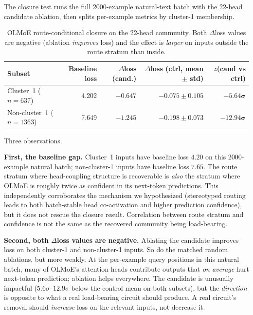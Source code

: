 \documentclass[11pt]{article}
\begin{document}
The closure test runs the full 2000-example natural-text batch with the
22-head candidate ablation, then splits per-example metrics by cluster-1
membership.

\begin{table}[h]
\centering
\small
\begin{tabularx}{\textwidth}{lrrrr}
\toprule
Subset & Baseline loss & $\Delta$loss (cand.) & $\Delta$loss (ctrl, mean $\pm$ std) & $z$(cand vs ctrl) \\
\midrule
Cluster~1 ($n=637$) & 4.202 & $\mathbf{-0.647}$ & $-0.075 \pm 0.105$ & $\mathbf{-5.64\sigma}$ \\
Non-cluster~1 ($n=1363$) & 7.649 & $\mathbf{-1.245}$ & $-0.198 \pm 0.073$ & $\mathbf{-12.94\sigma}$ \\
\bottomrule
\end{tabularx}
\caption{OLMoE route-conditional closure on the 22-head community. Both
$\Delta$loss values are negative (ablation \emph{improves} loss) and
the effect is \emph{larger} on inputs outside the route stratum than
inside.}
\label{tab:moe-closure}
\end{table}

Three observations.

\textbf{First, the baseline gap.} Cluster~1 inputs have baseline loss
$4.20$ on this 2000-example natural batch; non-cluster-1 inputs have
baseline loss $7.65$. The route stratum where head-coupling structure is
recoverable is \emph{also} the stratum where OLMoE is roughly twice as
confident in its next-token predictions. This independently corroborates
the mechanism we hypothesized (stereotyped routing leads to both
batch-stable head co-activation and higher prediction confidence), but it
does not rescue the closure result. Correlation between route stratum and
confidence is not the same as the recovered community being load-bearing.

\textbf{Second, both $\Delta$loss values are negative.} Ablating the
candidate improves loss on both cluster-1 and non-cluster-1 inputs. So do
the matched random ablations, but more weakly. At the per-example query
positions in this natural batch, many of OLMoE's attention heads
contribute outputs that \emph{on average} hurt next-token prediction;
ablation helps everywhere. The candidate is unusually impactful
($5.6\sigma$--$12.9\sigma$ below the control mean on both subsets), but
the \emph{direction} is opposite to what a real load-bearing circuit
should produce. A real circuit's removal should \emph{increase} loss on
the relevant inputs, not decrease it.
\end{document}
